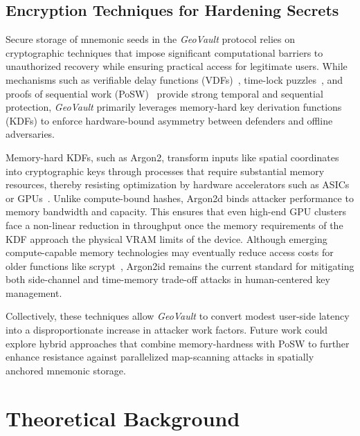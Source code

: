 \documentclass[journal,article,accept,pdftex,moreauthors]{Definitions/mdpi}
\begin{document}
\subsection{ Encryption Techniques for Hardening Secrets}













Secure storage of mnemonic seeds in the \textit{GeoVault} protocol relies on cryptographic techniques that impose significant computational barriers to unauthorized recovery while ensuring practical access for legitimate users. While mechanisms such as verifiable delay functions (VDFs)~\cite{Boneh2018, Wesolowski2019}, time-lock puzzles~\cite{Mahmoody2011}, and proofs of sequential work (PoSW)~\cite{Cohen2018} provide strong temporal and sequential protection, \textit{GeoVault} primarily leverages memory-hard key derivation functions (KDFs) to enforce hardware-bound asymmetry between defenders and offline adversaries.

Memory-hard KDFs, such as Argon2, transform inputs like spatial coordinates into cryptographic keys through processes that require substantial memory resources, thereby resisting optimization by hardware accelerators such as ASICs or GPUs~\cite{7467361, Wetzels2016}. Unlike compute-bound hashes, Argon2d binds attacker performance to memory bandwidth and capacity. This ensures that even high-end GPU clusters face a non-linear reduction in throughput once the memory requirements of the KDF approach the physical VRAM limits of the device. Although emerging compute-capable memory technologies may eventually reduce access costs for older functions like scrypt~\cite{Choe2019}, Argon2id remains the current standard for mitigating both side-channel and time-memory trade-off attacks in human-centered key management.

Collectively, these techniques allow \textit{GeoVault} to convert modest user-side latency into a disproportionate increase in attacker work factors. Future work could explore hybrid approaches that combine memory-hardness with PoSW to further enhance resistance against parallelized map-scanning attacks in spatially anchored mnemonic storage.

\section{Theoretical Background}
\end{document}
